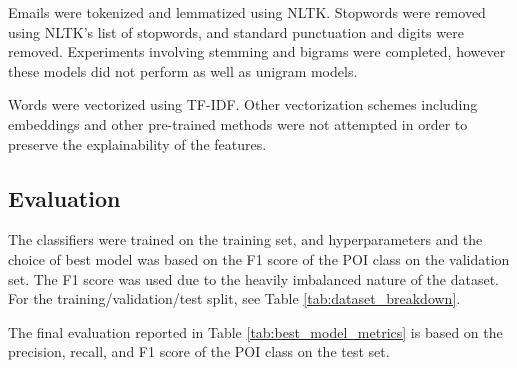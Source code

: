 Emails were tokenized and lemmatized using NLTK. Stopwords were removed using NLTK's list of stopwords, and standard punctuation and digits were removed. Experiments involving stemming and bigrams were completed, however these models did not perform as well as unigram models.

Words were vectorized using TF-IDF. Other vectorization schemes including embeddings and other pre-trained methods were not attempted in order to preserve the explainability of the features. 

\subsection{Evaluation}

The classifiers were trained on the training set, and hyperparameters and the choice of best model was based on the F1 score of the POI class on the validation set. The F1 score was used due to the heavily imbalanced nature of the dataset. For the training/validation/test split, see Table \ref{tab:dataset_breakdown}.

The final evaluation reported in Table \ref{tab:best_model_metrics} is based on the precision, recall, and F1 score of the POI class on the test set.
